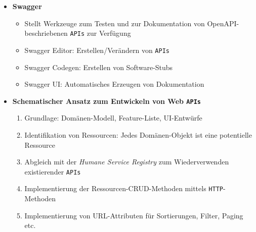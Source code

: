 \begin{itemize}
\begin{itemize}
\begin{description}
		\end{description}
	\end{itemize}
	\item \textbf{Swagger}
	\begin{itemize}
		\item Stellt Werkzeuge zum Testen und zur Dokumentation von OpenAPI-beschriebenen \texttt{APIs} zur Verfügung
		\item Swagger Editor: Erstellen/Verändern von \texttt{APIs}
		\item Swagger Codegen: Erstellen von Software-Stubs
		\item Swagger UI: Automatisches Erzeugen von Dokumentation
	\end{itemize}
	\item \textbf{Schematischer Ansatz zum Entwickeln von Web \texttt{APIs}}
	\begin{enumerate}
		\item Grundlage: Domänen-Modell, Feature-Liste, UI-Entwürfe
		\item Identifikation von Ressourcen: Jedes Domänen-Objekt ist eine potentielle Ressource
		\item Abgleich mit der \textit{Humane Service Registry} zum Wiederverwenden existierender \texttt{APIs}
		\item Implementierung der Ressourcen-CRUD-Methoden mittels \texttt{HTTP}-Methoden
		\item Implementierung von URL-Attributen für Sortierungen, Filter, Paging etc.
	\end{enumerate}
\end{itemize}


